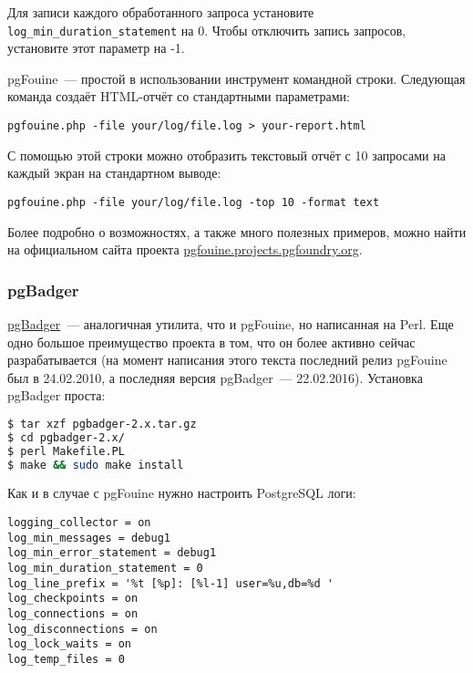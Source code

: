 Для записи каждого обработанного запроса установите \lstinline!log_min_duration_statement! на 0. Чтобы отключить запись запросов, установите этот параметр на -1.

pgFouine~--- простой в использовании инструмент командной строки. Следующая команда создаёт HTML-отчёт со стандартными параметрами:

\begin{lstlisting}[label=lst:sql_performance7,caption=pgFouine]
pgfouine.php -file your/log/file.log > your-report.html
\end{lstlisting}

С помощью этой строки можно отобразить текстовый отчёт с 10 запросами на каждый экран на стандартном выводе:

\begin{lstlisting}[label=lst:sql_performance8,caption=pgFouine]
pgfouine.php -file your/log/file.log -top 10 -format text
\end{lstlisting}

Более подробно о возможностях, а также много полезных примеров, можно найти на официальном сайта проекта \href{http://pgfouine.projects.pgfoundry.org/}{pgfouine.projects.pgfoundry.org}.


\subsubsection{pgBadger}


\href{http://dalibo.github.io/pgbadger/}{pgBadger}~--- аналогичная утилита, что и pgFouine, но написанная на Perl. Еще одно большое преимущество проекта в том, что он более активно сейчас разрабатывается (на момент написания этого текста последний релиз pgFouine был в 24.02.2010, а последняя версия pgBadger~--- 22.02.2016). Установка pgBadger проста:

\begin{lstlisting}[language=Bash,label=lst:sql_performance9,caption=Установка pgBadger]
$ tar xzf pgbadger-2.x.tar.gz
$ cd pgbadger-2.x/
$ perl Makefile.PL
$ make && sudo make install
\end{lstlisting}

Как и в случае с pgFouine нужно настроить PostgreSQL логи:

\begin{lstlisting}[label=lst:sql_performance10,caption=Настройка логов PostgreSQL]
logging_collector = on
log_min_messages = debug1
log_min_error_statement = debug1
log_min_duration_statement = 0
log_line_prefix = '%t [%p]: [%l-1] user=%u,db=%d '
log_checkpoints = on
log_connections = on
log_disconnections = on
log_lock_waits = on
log_temp_files = 0
\end{lstlisting}

